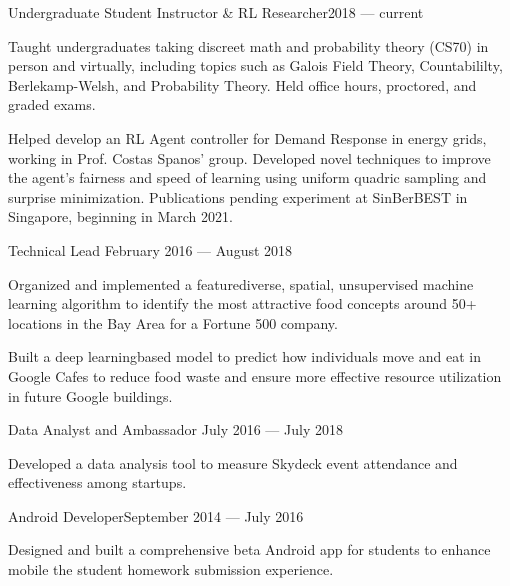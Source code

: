 \documentclass[10pt]{article}
\begin{document}
            {Undergraduate Student Instructor \& RL Researcher}{2018 --- current}
                  \begin{accomplishments}
                \item Taught undergraduates taking discreet math and probability theory (CS70) in person and virtually, including topics such as Galois Field Theory, Countabililty, Berlekamp-Welsh, and Probability Theory. Held office hours, proctored, and graded exams.
                \item Helped develop an RL Agent controller for Demand Response in energy grids, working in Prof. Costas Spanos' group. Developed novel techniques to improve the agent's fairness and speed of learning using uniform quadric sampling and surprise minimization.
                  Publications pending experiment at SinBerBEST in Singapore, beginning in March 2021.
                \end{accomplishments}


								{Technical Lead}
								{February 2016 --- August 2018}                  		
	                   \begin{accomplishments} 
	                    		\item Organized and implemented a feature{\textendash}diverse, spatial, unsupervised machine learning algorithm to identify the most attractive food concepts around 50+ locations in the Bay Area for a Fortune 500 company.
                          \item Built a deep learning{\textendash}based model to predict how individuals move and eat in Google Cafes to reduce food waste and ensure more effective resource utilization in future Google buildings.
	                    \end{accomplishments}
	                    		
	   		
	   		\employer{Skydeck Berkeley}{Berkeley, CA}
	   			{Data Analyst and Ambassador}
	   			{July 2016 --- July 2018}
			  		\begin{accomplishments}
	                   		\item Developed a data analysis tool to measure Skydeck event attendance and effectiveness among startups.
	                  \end{accomplishments}
                  	 
                  	 
                {Android Developer}{September 2014 --- July 2016}
                 			\begin{accomplishments}					        
                   			\item Designed and built a comprehensive beta Android app for students to enhance mobile the student homework submission experience.
                  		 \end{accomplishments}
                  		 
\end{document}
